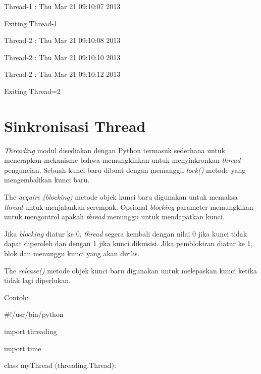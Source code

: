 \documentclass [12pt,a4paper,notitlepage,oneside,bahasa]{article}
\begin{document}
\noindent 
{\fontsize{10pt}{10pt}\selectfont Thread-1 : Thu Mar 21 09:10:07 2013} \par
\noindent 
{\fontsize{10pt}{10pt}\selectfont Exiting Thread-1} \par
\noindent 
{\fontsize{10pt}{10pt}\selectfont Thread-2 : Thu Mar 21 09:10:08 2013} \par
\noindent 
{\fontsize{10pt}{10pt}\selectfont Thread-2 : Thu Mar 21 09:10:10 2013} \par
\noindent 
{\fontsize{10pt}{10pt}\selectfont Thread-2 : Thu Mar 21 09:10:12 2013} \par
\noindent 
{\fontsize{10pt}{10pt}\selectfont Exiting Thread=2} \par
\vspace{10pt}
\section{Sinkronisasi Thread}
\textit{Threading} modul disediakan dengan Python termasuk sederhana untuk menerapkan mekanisme bahwa memungkinkan untuk menyinkronkan \textit{thread}\textit{ }penguncian. Sebuah kunci baru dibuat dengan memanggil \textit{lock() }metode yang mengembalikan kunci baru. \par
The \textit{acquire}\textit{ }\textit{(blocking)}\textit{ }metode objek kunci baru digunakan untuk memaksa \textit{thread}\textit{ }untuk menjalankan serempak. Opsional \textit{blocking} parameter memungkikan untuk mengontrol apakah\textit{ thread} menunggu untuk mendapatkan kunci. \par
Jika \textit{blocking} diatur ke 0, \textit{thread} segera kembali dengan nilai 0 jika kunci tidak dapat diperoleh dan dengan 1 jika kunci dikuisisi. Jika pemblokiran diatur ke 1, blok dan menunggu kunci yang akan dirilis. \par
The \textit{release()} metode objek kunci baru digunakan untuk melepaskan kunci ketika tidak lagi diperlukan.  \par
\noindent 
Contoh: \par
\noindent 
{\fontsize{10pt}{10pt}\selectfont  $  \#  $!/usr/bin/python} \par
\vspace{10pt}
\noindent 
{\fontsize{10pt}{10pt}\selectfont import threading} \par
\noindent 
{\fontsize{10pt}{10pt}\selectfont import time} \par
\vspace{10pt}
\noindent 
{\fontsize{10pt}{10pt}\selectfont class myThread (threading.Thread):} \par
\end{document}
